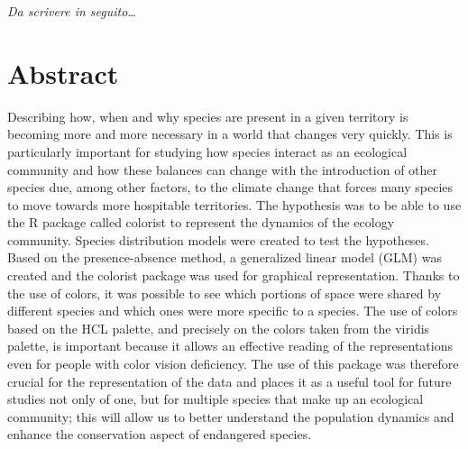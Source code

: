 \documentclass[12pt,a4paper]{article}
\begin{document}
\begin{titlepage}                      
%
\thispagestyle{empty}                   %
\topmargin=6.5cm                        %
\raggedleft                             %
\large                                  %
                                       
\em                                     %
Da scrivere in seguito\ldots                      %
\newpage                                
\clearpage{\pagestyle{empty}\cleardoublepage}%
\end{titlepage}
\linespread{1.2} 
\newpage
\tableofcontents
\linespread{1.5} 
\newpage
\section{Abstract}
 Describing how, when and why species are present in a given territory is becoming more and more necessary in a world that changes very quickly.
This is particularly important for studying how species interact as an ecological community and how these balances can change with the introduction of other species due, among other factors, to the climate change that forces many species to move towards more hospitable territories.
The hypothesis was to be able to use the R package called colorist to represent the dynamics of the ecology community.
Species distribution models were created to test the hypotheses. Based on the presence-absence method, a generalized linear model (GLM) was created and the colorist package was used for graphical representation.
Thanks to the use of colors, it was possible to see which portions of space were shared by different species and which ones were more specific to a species.
The use of colors based on the HCL palette, and precisely on the colors taken from the viridis palette, is important because it allows an effective reading of the representations even for people with color vision deficiency.
The use of this package was therefore crucial for the representation of the data and places it as a useful tool for future studies not only of one, but for multiple species that make up an ecological community; this will allow us to better understand the population dynamics and enhance the conservation aspect of endangered species.
 
\end{document}

